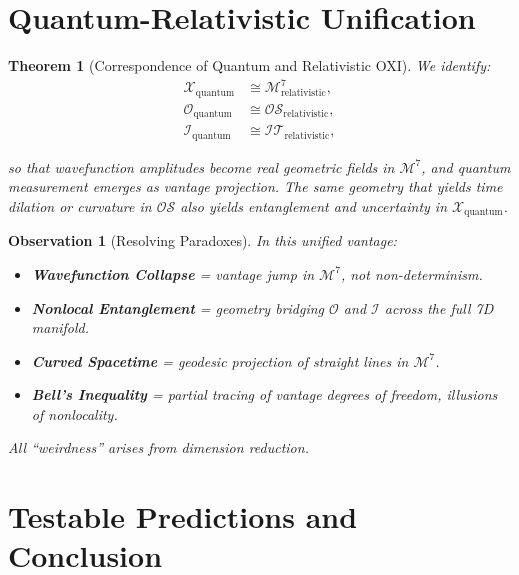 \documentclass{article}
\newtheorem{theorem}{Theorem}
\newtheorem{observation}{Observation}
\begin{document}
\section{Quantum-Relativistic Unification}

\begin{theorem}[Correspondence of Quantum and Relativistic OXI]
We identify:
\begin{align}
\mathcal{X}_{\text{quantum}} &\cong \mathcal{M}^7_{\text{relativistic}},\\
\mathcal{O}_{\text{quantum}} &\cong \mathcal{OS}_{\text{relativistic}},\\
\mathcal{I}_{\text{quantum}} &\cong \mathcal{IT}_{\text{relativistic}},
\end{align}

so that wavefunction amplitudes become real geometric fields in $\mathcal{M}^7$, and quantum measurement emerges as vantage projection. The same geometry that yields time dilation or curvature in $\mathcal{OS}$ also yields entanglement and uncertainty in $\mathcal{X}_{\text{quantum}}$.
\end{theorem}

\begin{observation}[Resolving Paradoxes]
In this unified vantage:
\begin{itemize}
  \item \textbf{Wavefunction Collapse} = vantage jump in $\mathcal{M}^7$, not non-determinism.
  \item \textbf{Nonlocal Entanglement} = geometry bridging $\mathcal{O}$ and $\mathcal{I}$ across the full 7D manifold.
  \item \textbf{Curved Spacetime} = geodesic projection of straight lines in $\mathcal{M}^7$.
  \item \textbf{Bell's Inequality} = partial tracing of vantage degrees of freedom, illusions of nonlocality.
\end{itemize}
All “weirdness” arises from dimension reduction.
\end{observation}

\section{Testable Predictions and Conclusion}
\end{document}
